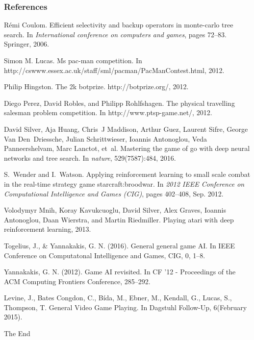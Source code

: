 \documentclass{beamer}
\begin{document}
\begin{frame}[allowframebreaks]
\frametitle{References}
\footnotesize{
\begin{thebibliography}{99} %
    R{\'e}mi Coulom.
    \newblock Efficient selectivity and backup operators in monte-carlo tree search.
    \newblock In {\em International conference on computers and games}, pages 72--83. Springer, 2006.

    Simon M. Lucas. 
    \newblock Ms pac-man competition. 
    \newblock In http://cswww.essex.ac.uk/staff/sml/pacman/PacManContest.html, 2012.

    Philip Hingston.
    \newblock The 2k botprize.
    \newblock http://botprize.org/, 2012.

    Diego Perez, David Robles, and Philipp Rohlfshagen. 
    \newblock The physical travelling salesman problem competition. 
    \newblock In http://www.ptsp-game.net/, 2012. 
    
    David Silver, Aja Huang, Chris~J Maddison, Arthur Guez, Laurent Sifre, George Van Den~Driessche, Julian Schrittwieser, Ioannis Antonoglou, Veda Panneershelvam, Marc Lanctot, et~al.
    \newblock Mastering the game of go with deep neural networks and tree search.
    \newblock In {\em nature}, 529(7587):484, 2016.

    S.~{Wender} and I.~{Watson}.
    \newblock Applying reinforcement learning to small scale combat in the real-time strategy game starcraft:broodwar.
    \newblock In {\em 2012 IEEE Conference on Computational Intelligence and Games (CIG)}, pages 402--408, Sep. 2012.

    Volodymyr Mnih, Koray Kavukcuoglu, David Silver, Alex Graves, Ioannis Antonoglou, Daan Wierstra, and Martin Riedmiller.
    \newblock Playing atari with deep reinforcement learning, 2013.

    Togelius, J., \& Yannakakis, G. N. (2016). 
    \newblock General general game AI. 
    \newblock In IEEE Conference on Computatonal Intelligence and Games, CIG, 0, 1–8.

    Yannakakis, G. N. (2012). 
    \newblock Game AI revisited.
    \newblock In CF ’12 - Proceedings of the ACM Computing Frontiers Conference, 285–292.

    Levine, J., Bates Congdon, C., Bída, M., Ebner, M., Kendall, G., Lucas, S., Thompson, T.
    \newblock General Video Game Playing. 
    \newblock In Dagstuhl Follow-Up, 6(February 2015).

    \end{thebibliography}
}
\end{frame}


\begin{frame}
\Huge{\centerline{The End}}
\end{frame}

\end{document}
